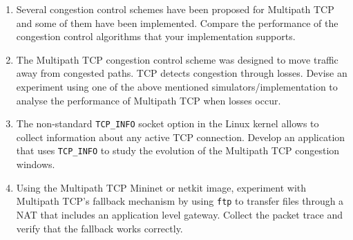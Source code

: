 \begin{enumerate}

\item Several congestion control schemes have been proposed for Multipath TCP and some of them have been implemented. Compare the performance of the congestion control algorithms that your implementation supports. 

\item The Multipath TCP congestion control scheme was designed to move traffic away from congested paths. TCP detects congestion through losses. Devise an experiment using one of the above mentioned simulators/implementation to analyse the performance of Multipath TCP when losses occur.

\item The non-standard \texttt{TCP\_INFO} socket option\cite{Pfeiffer_Measuring:2007} in the Linux kernel allows to collect information about any active TCP connection. Develop an application that uses \texttt{TCP\_INFO} to study the evolution of the Multipath TCP congestion windows.


\item Using the Multipath TCP  Mininet or netkit image, experiment with Multipath TCP's fallback mechanism by using \texttt{ftp} to transfer files through a NAT that includes an application level gateway. Collect the packet trace and verify that the fallback works correctly.

\end{enumerate}





